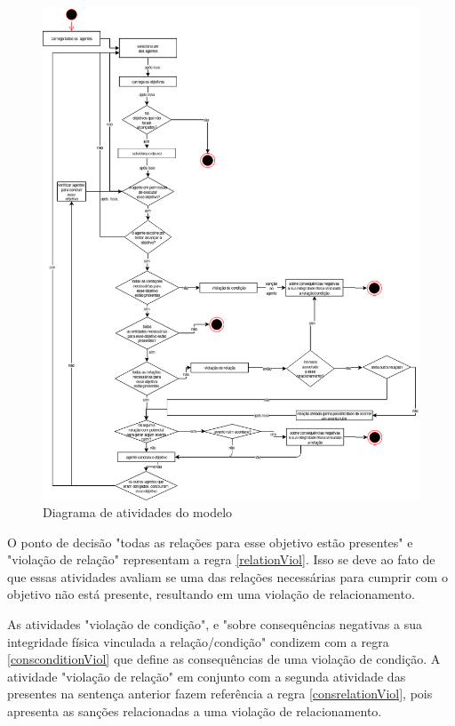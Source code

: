 \begin{figure}[H]
  \centering
  \includegraphics[width=1\linewidth]{figure/DiagramaDeAtividade.png} 
  \caption{Diagrama de atividades do modelo}
  \label{atividiagram}
\end{figure}

O ponto de decisão "todas as relações para esse objetivo estão presentes" e "violação de relação" representam a regra \ref{relationViol}. Isso se deve ao fato de que essas atividades avaliam se uma das relações necessárias para cumprir com o objetivo não está presente, resultando em uma violação de relacionamento. 

As atividades "violação de condição", e "sobre consequências negativas a sua integridade física vinculada a relação/condição" condizem com a regra \ref{consconditionViol} que define as consequências de uma violação de condição. A atividade "violação de relação" em conjunto com a segunda atividade das presentes na sentença anterior fazem referência a regra \ref{consrelationViol}, pois apresenta as sanções relacionadas a uma violação de relacionamento. 

